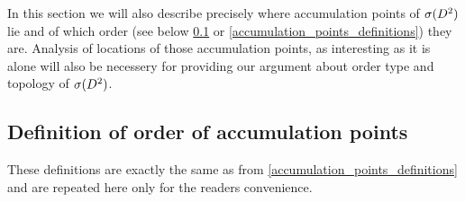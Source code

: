 In this section we will also describe precisely where accumulation points of ${{\sigma}(D^2)}$ lie and of 
 which order 
(see below \ref{accumulation_points_definitions repetition} or 
\ref{accumulation_points_definitions}) they are. Analysis of locations of those 
accumulation points, as interesting as it is alone will also be necessery for providing 
our argument about order type and topology of ${{\sigma}(D^2)}$. 
\subsection{Definition of order of accumulation points}
\label{accumulation_points_definitions repetition} 
These definitions are exactly the same as from \ref{accumulation_points_definitions} and 
are repeated here only for the readers convenience.

